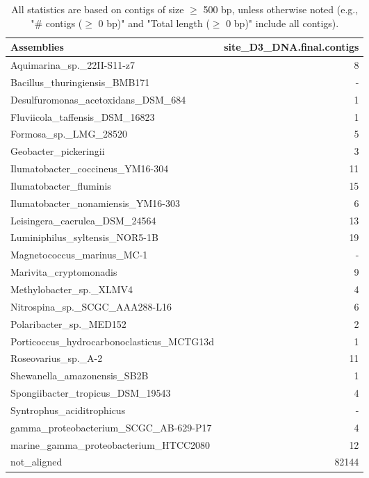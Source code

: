 \documentclass[12pt,a4paper]{article}
\begin{document}
\begin{table}[ht]
\begin{center}
\caption{All statistics are based on contigs of size $\geq$ 500 bp, unless otherwise noted (e.g., "\# contigs ($\geq$ 0 bp)" and "Total length ($\geq$ 0 bp)" include all contigs).}
\begin{tabular}{|l*{1}{|r}|}
\hline
Assemblies & site\_D3\_DNA.final.contigs \\ \hline
Aquimarina\_sp.\_22II-S11-z7 & 8 \\ \hline
Bacillus\_thuringiensis\_BMB171 & - \\ \hline
Desulfuromonas\_acetoxidans\_DSM\_684 & 1 \\ \hline
Fluviicola\_taffensis\_DSM\_16823 & 1 \\ \hline
Formosa\_sp.\_LMG\_28520 & 5 \\ \hline
Geobacter\_pickeringii & 3 \\ \hline
Ilumatobacter\_coccineus\_YM16-304 & 11 \\ \hline
Ilumatobacter\_fluminis & 15 \\ \hline
Ilumatobacter\_nonamiensis\_YM16-303 & 6 \\ \hline
Leisingera\_caerulea\_DSM\_24564 & 13 \\ \hline
Luminiphilus\_syltensis\_NOR5-1B & 19 \\ \hline
Magnetococcus\_marinus\_MC-1 & - \\ \hline
Marivita\_cryptomonadis & 9 \\ \hline
Methylobacter\_sp.\_XLMV4 & 4 \\ \hline
Nitrospina\_sp.\_SCGC\_AAA288-L16 & 6 \\ \hline
Polaribacter\_sp.\_MED152 & 2 \\ \hline
Porticoccus\_hydrocarbonoclasticus\_MCTG13d & 1 \\ \hline
Roseovarius\_sp.\_A-2 & 11 \\ \hline
Shewanella\_amazonensis\_SB2B & 1 \\ \hline
Spongiibacter\_tropicus\_DSM\_19543 & 4 \\ \hline
Syntrophus\_aciditrophicus & - \\ \hline
gamma\_proteobacterium\_SCGC\_AB-629-P17 & 4 \\ \hline
marine\_gamma\_proteobacterium\_HTCC2080 & 12 \\ \hline
not\_aligned & 82144 \\ \hline
\end{tabular}
\end{center}
\end{table}
\end{document}
